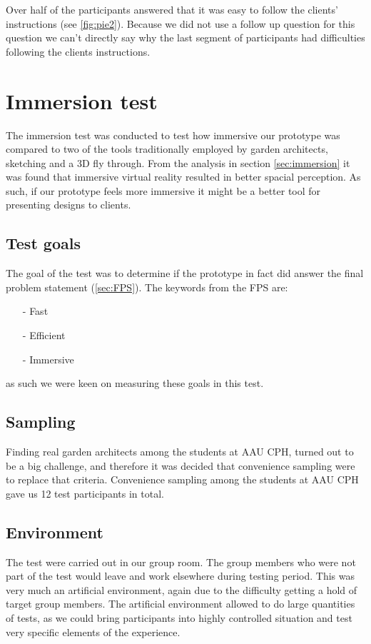 Over half of the participants answered that it was easy to follow the clients' instructions (see \autoref{fig:pie2}). Because we did not use a follow up question for this question we can't directly say why the last segment of participants had difficulties following the clients instructions.\\



\section{Immersion test}
The immersion test was conducted to test how immersive our prototype was compared to two of the tools traditionally employed by garden architects, sketching and a 3D fly through. From the analysis in section \ref{sec:immersion} it was found that immersive virtual reality resulted in better spacial perception. As such, if our prototype feels more immersive it might be a better tool for presenting designs to clients.

\subsection{Test goals}
The goal of the test was to determine if the prototype in fact did answer the final problem statement (\autoref{sec:FPS}). The keywords from the FPS are:
\begin{itemize}
	\item[-] Fast
	\item[-] Efficient
	\item[-] Immersive
\end{itemize}
as such we were keen on measuring these goals in this test.
\subsection{Sampling}
Finding real garden architects among the students at AAU CPH, turned out to be a big challenge, and therefore it was decided that convenience sampling were to replace that criteria. Convenience sampling among the students at AAU CPH gave us 12 test participants in total.
\subsection{Environment}
The test were carried out in our group room. The group members who were not part of the test would leave and work elsewhere during testing period. This was very much an artificial environment, again due to the difficulty getting a hold of target group members. The artificial environment allowed to do large quantities of tests, as we could bring participants into highly controlled situation and test very specific elements of the experience.\cite[p.~64]{bjoernerBog}
